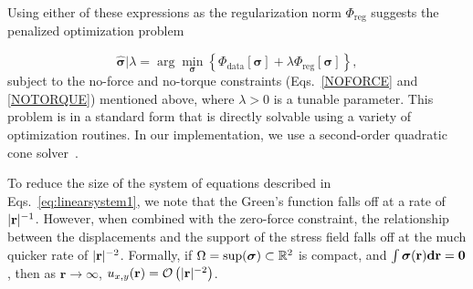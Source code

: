 \documentclass[aps,prl,reprint,twocolumn,groupedaddress,showpacs]{revtex4-1}
\DeclarePairedDelimiter{\norm}{\lVert}{\rVert}
\newcommand{\bsigma}{{\boldsymbol\sigma}}
\def\d{{\bf d}}
\def\r{{\bf r}}
\def\u{{\bf u}}
\begin{document}
Using either of these expressions as the regularization norm
$\Phi_{\textrm{reg}}$ suggests the penalized optimization problem

\begin{equation}
\hat{\bsigma} \big\vert \lambda = \arg\min_{\bsigma} \left\{ \Phi_{\textrm{data}}[\bsigma] + 
\lambda\Phi_{\textrm{reg}}[\bsigma] \right\},
\label{eq:objective}
\end{equation}
%
subject to the no-force and no-torque constraints (Eqs.~\ref{NOFORCE}
and \ref{NOTORQUE}) mentioned above, where $\lambda>0$ is a tunable
parameter. This problem is in a standard form that is directly
solvable using a variety of optimization routines.  In our
implementation, we use a second-order quadratic cone solver~\cite{cvxpy}.

To reduce the size of the system of equations described in
Eqs.~\ref{eq:linearsystem1}, we note that the Green's function falls
off at a rate of $|\r|^{-1}$. However, when combined with the
zero-force constraint, the relationship between the
displacements and the support of the stress field falls off at the
much quicker rate of $|\r|^{-2}$. Formally, if 
%
%
$\Omega = {\rm sup}(\bsigma)\subset \mathbb{R}^2$ is compact, and
 $\int \bsigma(\r)\d\r = \mathbf{0}$, then
as $\mathbf{r}\to\infty$, $u_{x,y}(\r) = \mathcal{O}\left( |\r|^{-2} \right)$.


%
\end{document}

